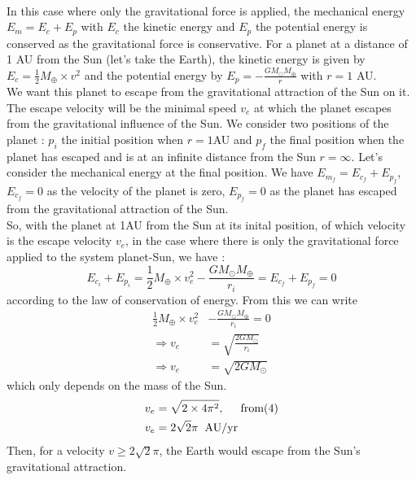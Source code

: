 \documentclass[a4paper, twoside, 11pt]{report}
\theoremstyle{theorem}
\theoremstyle{remark}
\theoremstyle{exemple}
\begin{document}
            \paragraph{}In this case where only the gravitational force is applied, the mechanical energy $E_m = E_c + E_p$ with $E_c$ the kinetic energy and $E_p$ the potential energy is conserved as the gravitational force is conservative. For a planet at a distance of 1 AU from the Sun (let's take the Earth), the kinetic energy is given by $E_c = \frac{1}{2}M_{\oplus}\times v^2$ and the potential energy by $E_p = - \frac{G M_{\odot} M_{\oplus}}{r}$ with $r=1$ AU.\\ 
            We want this planet to escape from the gravitational attraction of the Sun on it. The escape velocity will be the minimal speed $v_e$ at which the planet escapes from the gravitational influence of the Sun. We consider two positions of the planet : $p_i$ the initial position when $r=1$AU and $p_f$ the final position when the planet has escaped and is at an infinite distance from the Sun $r=\infty$. Let's consider the mechanical energy at the final position. We have $E_{m_f} = E_{c_f} + E_{p_f}$, $E_{c_f} = 0$ as the velocity of the planet is zero, $E_{p_f}=0$ as the planet has escaped from the gravitational attraction of the Sun. \\
            So, with the planet at 1AU from the Sun at its inital position, of which velocity is the escape velocity $v_e$, in the case where there is only the gravitational force applied to the system planet-Sun, we have :
                \begin{equation*}
                    E_{c_i} + E_{p_i} = \frac{1}{2}M_{\oplus} \times v_e^2 - \frac{GM_{\odot}M_{\oplus}}{r_i} = E_{c_f} + E_{p_f} = 0
                \end{equation*}
            according to the law of conservation of energy. From this we can write
                \begin{align*}
                    \frac{1}{2}M_{\oplus} \times v_e^2 &- \frac{GM_{\odot}M_{\oplus}}{r_i} = 0 \\
                    \Rightarrow v_e &= \sqrt{\frac{2GM_{\odot}}{r_i}} \\
                    \Rightarrow v_e &=\sqrt{2GM_{\odot}}
                \end{align*}
            which only depends on the mass of the Sun. 
                \begin{align*}
                    v_e &= \sqrt{2\times 4\pi^2}, \hspace{0.5cm} \mathrm{from (4)}\\
                    v_e &= 2\sqrt{2}\pi \hspace{0.2cm} \mathrm{AU/yr}
                \end{align*}
            Then, for a velocity $v \geq 2\sqrt{2}\pi$, the Earth would escape from the Sun's gravitational attraction. 
                        
\end{document}
